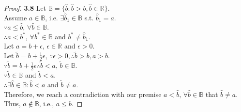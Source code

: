 \documentclass{article}
\begin{document}
\begin{proof}
\textbf{3.8} Let $\mathbb{B} = \{\hat{b}: \hat{b} > b, \hat{b} \in \mathbb{R}\}$.
\\ Assume $a \in \mathbb{B}$, i.e. $\exists \hat{b}_1 \in \mathbb{B}$ s.t. $\hat{b}_1 = a$.
\\ $\because a \leq \hat{b}$, $\forall \hat{b} \in \mathbb{B}$.
\\ $\therefore a < b^*$, $\forall b^* \in \mathbb{B}$ and $b^* \neq \hat{b}_1$.
\\ Let $a = b + \epsilon$, $\epsilon \in \mathbb{R}$ and $\epsilon > 0$.
\\ Let $\tilde{b} = b + \frac{1}{2} \epsilon$, $\because \epsilon > 0, \therefore \tilde{b} > b, a > b$. 
\\ $\because \tilde{b} = b + \frac{1}{2}\epsilon \therefore \tilde{b} < a$, $\tilde{b} \in \mathbb{B}$.
\\ $\because \tilde{b} \in \mathbb{B}$ and $\tilde{b} < a$.
\\ $\therefore \exists \hat{b} \in \mathbb{B}: \hat{b} < a$ and $\tilde{b} \neq a$. 
\\Therefore, we reach a contradiction with our premise $a < \hat{b}$, $\forall \hat{b} \in \mathbb{B}$ that $\hat{b} \neq a$. 
\\Thus, $a \notin \mathbb{B}$, i.e., $a \leq b$. 
\end{proof}
\end{document}
